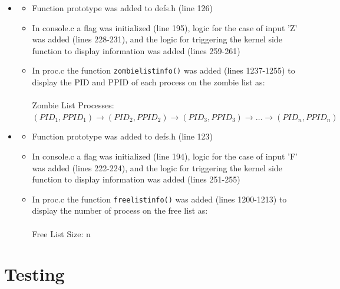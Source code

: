\documentclass[11pt,letterpaper]{report}
\begin{document}
\begin{itemize}
			\item {} 
				\begin{itemize}
					\item Function prototype was added to defs.h (line 126)
					\item In console.c a flag was initialized (line 195), logic for the case of input 'Z' was added (lines 228-231), and the logic for triggering the kernel side function to display information was added (lines 259-261)
					\item In proc.c the function {\tt zombielistinfo()} was added (lines 1237-1255) to display the PID and PPID of each process on the zombie list as: \\
						\\ Zombie List Processes: \\ $(PID_1, PPID_1) \rightarrow (PID_2, PPID_2) \rightarrow (PID_3, PPID_3) \rightarrow \ldots \rightarrow (PID_n, PPID_n)$
				\end{itemize}
			\item {} 
				\begin{itemize}
					\item Function prototype was added to defs.h (line 123)
					\item In console.c a flag was initialized (line 194), logic for the case of input 'F' was added (lines 222-224), and the logic for triggering the kernel side function to display information was added (lines 251-255)
					\item In proc.c the function {\tt freelistinfo()} was added (lines 1200-1213) to display the number of process on the free list as: \\
						\\ Free List Size: n \\
				\end{itemize}
		\end{itemize}
			
	
	
	
	\section*{Testing}
	
\end{document}
